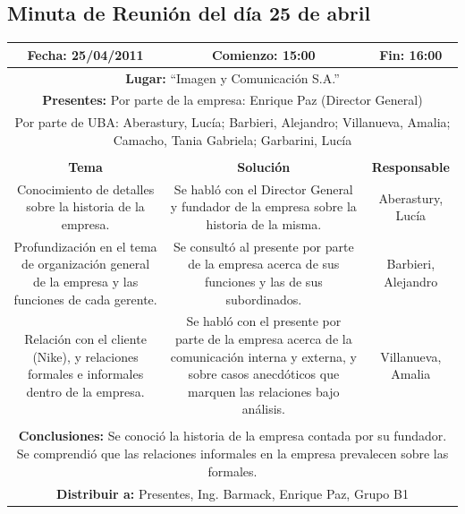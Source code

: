 \documentclass[a4paper,10pt,titlepage]{article}
\begin{document}
\newpage
\subsection{Minuta de Reuni\'on del d\'ia 25 de abril}
\vspace{1cm}
\begin{center}
\begin{tabular}{|c|c|c|}
	\hline
	\textbf{Fecha:} 25/04/2011 &  \textbf{Comienzo:} 15:00  &  \textbf{Fin:} 16:00 \\ \hline	

	\multicolumn{3}{|c|}{\textbf{Lugar:} ``Imagen y Comunicaci\'on S.A.''} \\
	\hline \multicolumn{3}{|p{0.86\linewidth}|}{\textbf{Presentes:} Por parte de la empresa: Enrique Paz (Director General)} \\
	\multicolumn{3}{|p{0.86\linewidth}|}{Por parte de UBA: Aberastury, Luc\'ia; Barbieri, Alejandro; Villanueva, Amalia; Camacho, Tania Gabriela; Garbarini, Luc\'ia} \\
	\hline
    \rowcolor[gray]{0.8} & & \\
    \hline
    \textbf{Tema} & \textbf{Solución} & \textbf{Responsable}\\
    \hline
    \multicolumn{1}{|p{0.33\linewidth}|}{Conocimiento de detalles sobre la historia de la empresa.} & \multicolumn{1}{p{0.33\linewidth}|}{Se habló con el Director General y fundador de la empresa sobre la historia de la misma.} & \multicolumn{1}{p{0.20\linewidth}|}{Aberastury, Luc\'ia}\\\hline
    \multicolumn{1}{|p{0.33\linewidth}|}{Profundizaci\'on en el tema de organizaci\'on general de la empresa y las funciones de cada gerente.} & \multicolumn{1}{p{0.33\linewidth}|}{Se consult\'o al presente por parte de la empresa acerca de sus funciones y las de sus subordinados.} & \multicolumn{1}{p{0.20\linewidth}|}{Barbieri, Alejandro}\\\hline
    \multicolumn{1}{|p{0.33\linewidth}|}{Relaci\'on con el cliente (Nike), y relaciones formales e informales dentro de la empresa.} & \multicolumn{1}{p{0.33\linewidth}|}{Se habl\'o con el presente por parte de la empresa acerca de la comunicaci\'on interna y externa, y sobre casos anecd\'oticos que marquen las relaciones bajo an\'alisis.} & \multicolumn{1}{p{0.20\linewidth}|}{Villanueva, Amalia}\\\hline
    \rowcolor[gray]{0.8} & & \\\hline
    \multicolumn{3}{|p{0.86\linewidth}|}{\textbf{Conclusiones:} Se conoci\'o la historia de la empresa contada por su fundador. Se comprendi\'o que las relaciones informales en la empresa prevalecen sobre las formales.}\\\hline
    \multicolumn{3}{|p{0.86\linewidth}|}{\textbf{Distribuir a:} Presentes, Ing. Barmack, Enrique Paz, Grupo B1}\\\hline
\end{tabular} 
\end{center}
\end{document}
